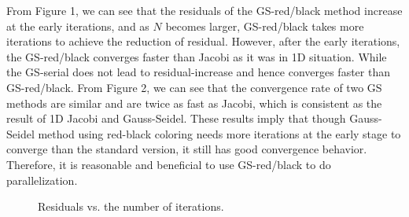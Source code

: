 \documentclass[11pt, oneside]{article}   	%
\begin{document}
From Figure 1, we can see that the residuals of the GS-red/black method increase at the early iterations, and as $N$ becomes larger, GS-red/black takes more iterations to achieve the reduction of residual. However, after the early iterations, the GS-red/black converges faster than Jacobi as it was in 1D situation. While the GS-serial does not lead to residual-increase and hence converges faster than GS-red/black. From Figure 2, we can see that the convergence rate of two GS methods are similar and are twice as fast as Jacobi, which is consistent as the result of 1D Jacobi and Gauss-Seidel. These results imply that though Gauss-Seidel method using red-black coloring needs more iterations at the early stage to converge than the standard version, it still has good convergence behavior. Therefore, it is reasonable and beneficial to use GS-red/black to do parallelization.
\begin{figure}[ht]
\caption{Residuals vs. the number of iterations.}
\end{figure}
\end{document}
